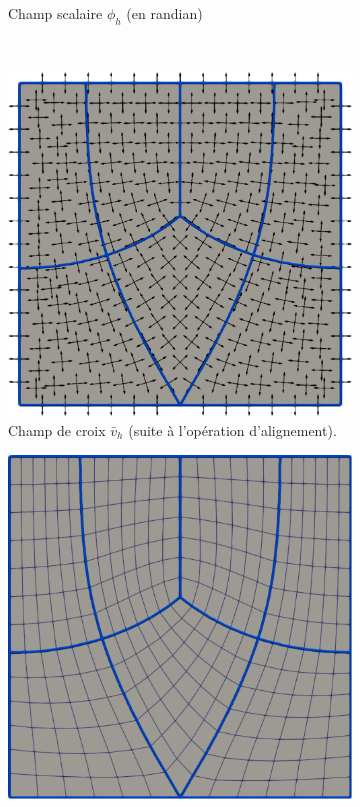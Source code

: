 \begin{figure}[h!]
\begin{subfigure}{0.478\textwidth}
    \caption{Champ scalaire $\phi_h$ (en randian)}
    \label{fig:alignment_2}
\end{subfigure}
\\[0.5cm]
\begin{subfigure}{0.51\textwidth}
    \includegraphics[width=\textwidth]{images/alignment_3.pdf}
    \caption{Champ de croix $\bar{v}_h$ (suite à l'opération d'alignement).}
    \label{fig:alignment_3}
\end{subfigure}
\hfill
\begin{subfigure}{0.482\textwidth}
    \includegraphics[width=\textwidth]{images/alignment_4.pdf}

\end{subfigure}
\end{figure}
